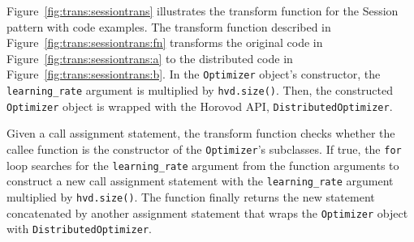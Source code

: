 \noindent

Figure~\ref{fig:trans:sessiontrans} illustrates the transform function for the
Session pattern with code examples.
The transform function described in Figure~\ref{fig:trans:sessiontrans:fn}
transforms the original code in Figure~\ref{fig:trans:sessiontrans:a} to
the distributed code in Figure~\ref{fig:trans:sessiontrans:b}.
In the {\tt Optimizer} object's constructor,
the {\tt learning\_rate} argument is multiplied by {\tt hvd.size()}.
Then, the constructed {\tt Optimizer} object
is wrapped with the Horovod API, {\tt DistributedOptimizer}.

Given a call assignment statement, the transform function checks whether the
callee function is the constructor of the {\tt Optimizer}'s subclasses.
If true, the {\tt for} loop searches for
the {\tt learning\_rate} argument from the function arguments
to construct a new call assignment statement 
with the {\tt learning\_rate} argument multiplied by {\tt hvd.size()}.
The function finally returns the new statement
concatenated by another assignment statement
that wraps the {\tt Optimizer} object with {\tt DistributedOptimizer}.



